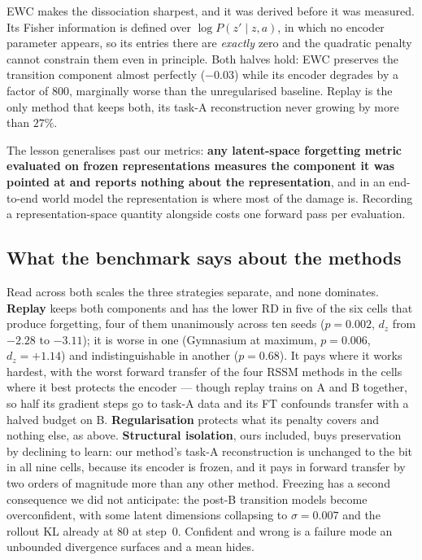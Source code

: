 \documentclass[11pt]{article}
\begin{document}
EWC makes the dissociation sharpest, and it was derived before it was measured.
Its Fisher information is defined over $\log P(z' \mid z, a)$, in which no
encoder parameter appears, so its entries there are \emph{exactly} zero and the
quadratic penalty cannot constrain them even in principle. Both halves hold:
EWC preserves the transition component almost perfectly ($-0.03$) while its
encoder degrades by a factor of $800$, marginally worse than the unregularised
baseline. Replay is the only method that keeps both, its task-A reconstruction
never growing by more than $27\%$.

The lesson generalises past our metrics: \textbf{any latent-space forgetting
metric evaluated on frozen representations measures the component it was
pointed at and reports nothing about the representation}, and in an end-to-end
world model the representation is where most of the damage is. Recording a
representation-space quantity alongside costs one forward pass per evaluation.

\subsection{What the benchmark says about the methods}
\label{sec:results:methods}

Read across both scales the three strategies separate, and none dominates.
\textbf{Replay} keeps both components and has the lower RD in five of the six
cells that produce forgetting, four of them unanimously across ten seeds
($p = 0.002$, $d_z$ from $-2.28$ to $-3.11$); it is worse in one (Gymnasium at
maximum, $p = 0.006$, $d_z = +1.14$) and indistinguishable in another
($p = 0.68$). It pays where it works hardest, with the worst forward transfer
of the four RSSM methods in the cells where it best protects the encoder ---
though replay trains on A and B together, so half its gradient steps go to
task-A data and its FT confounds transfer with a halved budget on B.
\textbf{Regularisation} protects what its penalty covers and nothing else, as
above. \textbf{Structural isolation}, ours included, buys preservation by
declining to learn: our method's task-A reconstruction is unchanged to the bit
in all nine cells, because its encoder is frozen, and it pays in forward
transfer by two orders of magnitude more than any other method. Freezing has a
second consequence we did not anticipate: the post-B transition models become
overconfident, with some latent dimensions collapsing to $\sigma = 0.007$ and
the rollout KL already at $80$ at step~0. Confident and wrong is a failure mode
an unbounded divergence surfaces and a mean hides.
\end{document}
